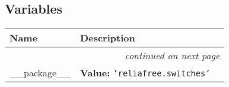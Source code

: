 
  \subsection{Variables}

    \vspace{-1cm}
\hspace{\varindent}\begin{longtable}{|p{\varnamewidth}|p{\vardescrwidth}|l}
\cline{1-2}
\cline{1-2} \centering \textbf{Name} & \centering \textbf{Description}& \\
\cline{1-2}
\endhead\cline{1-2}\multicolumn{3}{r}{\small\textit{continued on next page}}\\\endfoot\cline{1-2}
\endlastfoot\raggedright \_\-\_\-p\-a\-c\-k\-a\-g\-e\-\_\-\_\- & \raggedright \textbf{Value:} 
{\tt \texttt{'}\texttt{reliafree.switches}\texttt{'}}&\\
\cline{1-2}
\end{longtable}

